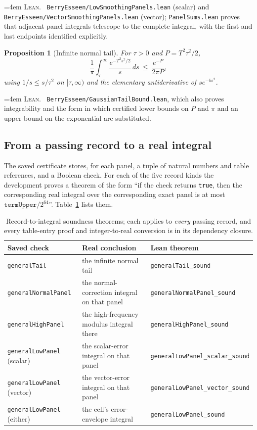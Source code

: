 \documentclass[10pt,a4paper]{article}
\theoremstyle{plain}
\newtheorem{proposition}[theorem]{Proposition}
\theoremstyle{definition}
\newcommand{\lean}[1]{\texttt{#1}}
\newcommand{\file}[1]{\texttt{#1}}
\newenvironment{leanref}%
  {\par\addvspace{3pt}\begingroup\sloppy\emergencystretch=4em
   \noindent\footnotesize\textsc{Lean.}\ \ignorespaces}%
  {\par\endgroup\addvspace{3pt}}
\begin{document}
\begin{leanref}
\file{BerryEsseen/LowSmoothingPanels.lean} (scalar) and
\file{BerryEsseen/VectorSmoothingPanels.lean} (vector);
\lean{PanelSums.lean} proves that adjacent panel integrals telescope to the
complete integral, with the first and last endpoints identified explicitly.
\end{leanref}

\begin{proposition}[Infinite normal tail]\label{prop:tail}
For $\tau>0$ and $P=T^2\tau^2/2$,
\[
  \frac1\pi\int_\tau^\infty\frac{e^{-T^2s^2/2}}{s}\,ds
  \ \le\ \frac{e^{-P}}{2\pi P} ,
\]
using $1/s\le s/\tau^2$ on $[\tau,\infty)$ and the elementary antiderivative of
$se^{-bs^2}$.
\end{proposition}

\begin{leanref}
\file{BerryEsseen/GaussianTailBound.lean}, which also proves integrability and
the form in which certified lower bounds on $P$ and $\pi$ and an upper bound
on the exponential are substituted.
\end{leanref}

\subsection{From a passing record to a real integral}

The saved certificate stores, for each panel, a tuple of natural numbers and
table references, and a Boolean check. For each of the five record kinds the
development proves a theorem of the form ``if the check returns \lean{true},
then the corresponding real integral over the corresponding exact panel is at
most $\lean{termUpper}/2^{64}$''. Table~\ref{tab:soundness} lists them.

\begin{table}[ht]
\centering
\small
\begin{tabular}{@{}lll@{}}
\toprule
Saved check & Real conclusion & Lean theorem \\
\midrule
\lean{generalTail} & the infinite normal tail
  & \lean{generalTail\_sound} \\
\lean{generalNormalPanel} & the normal-correction integral on that panel
  & \lean{generalNormalPanel\_sound} \\
\lean{generalHighPanel} & the high-frequency modulus integral there
  & \lean{generalHighPanel\_sound} \\
\lean{generalLowPanel} (scalar) & the scalar-error integral on that panel
  & \lean{generalLowPanel\_scalar\_sound} \\
\lean{generalLowPanel} (vector) & the vector-error integral on that panel
  & \lean{generalLowPanel\_vector\_sound} \\
\lean{generalLowPanel} (either) & the cell's error-envelope integral
  & \lean{generalLowPanel\_sound} \\
\bottomrule
\end{tabular}
\caption{Record-to-integral soundness theorems; each applies to \emph{every}
passing record, and every table-entry proof and integer-to-real conversion is in
its dependency closure.}
\label{tab:soundness}
\end{table}
\end{document}
